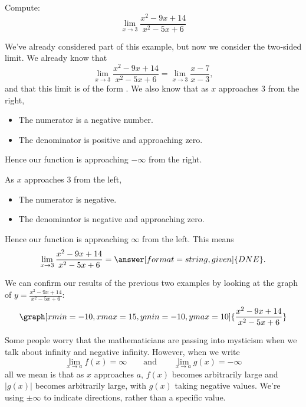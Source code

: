 \documentclass{ximera}
\begin{document}
\begin{example}
  Compute:
  \[
  \lim_{x\to 3} \frac{x^2-9x+14}{x^2-5x+6}
  \]
  \begin{explanation}
    We've already considered part of this example, but now we consider the two-sided limit. We already know that
    \[
    \lim_{x\to 3} \frac{x^2-9x+14}{x^2-5x+6} = \lim_{x\to
      3}\frac{x-7}{x-3},
    \]
    and that this limit is of the form \numOverZero.
    We also know that as $x$ approaches $3$ from the right,
    \begin{itemize}
    \item The numerator is a negative number. 
    \item The denominator is positive and approaching zero.
    \end{itemize}
    Hence our function is approaching $-\infty$ from the right.
    
    As $x$ approaches $3$ from the left,
    \begin{itemize}
    \item The numerator is negative.
    \item The denominator is negative and approaching zero.
    \end{itemize}
    Hence our function is approaching $\infty$ from the left.
    This means
    \[
    \lim_{x\to 3} \frac{x^2-9x+14}{x^2-5x+6} = \answer[format=string,given]{DNE}.
    \]
    \begin{onlineOnly}
     We can confirm our results of the previous two examples by looking at the graph of $y=\frac{x^2-9x+14}{x^2-5x+6}$:
     \[
     \graph[xmin=-10,xmax=15,ymin=-10,ymax=10]{\frac{x^2-9x+14}{x^2-5x+6}}
     \]
   \end{onlineOnly}
  \end{explanation}
\end{example}

Some people worry that the mathematicians are passing into mysticism
when we talk about infinity and negative infinity. However, when we write
\[
\lim_{x\to a} f(x) = \infty \qquad\text{and}\qquad \lim_{x\to a} g(x) = -\infty
\]
all we mean is that as $x$ approaches $a$, $f(x)$ becomes arbitrarily
large and $|g(x)|$ becomes arbitrarily large, with $g(x)$ taking
negative values. We're using $\pm \infty$ to indicate directions, rather than a specific value.
\end{document}
